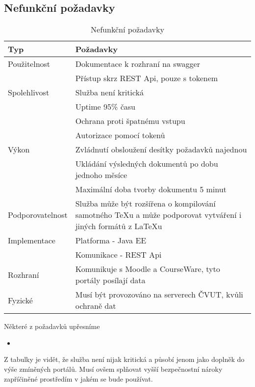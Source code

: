  \subsection{Nefunkční požadavky}
 
 \begin{table}[H]
 	\begin{center}
 		\begin{tabular}{ p{4cm} P{8,6cm} }
 			\textbf{Typ} & \textbf{Požadavky} \\
 			\midrule[0,15em]
 			Použitelnost & \tabitem Dokumentace k rozhraní na swagger\\
 						& \tabitem Přístup skrz REST Api, pouze s tokenem\\
 			\midrule		
 			Spolehlivost & \tabitem Služba není kritická\\
 						& \tabitem Uptime 95\% času\\
 						& \tabitem Ochrana proti špatnému vstupu\\
 						& \tabitem Autorizace pomocí tokenů\\
 			\midrule
 			Výkon & \tabitem Zvládnutí obsloužení desítky požadavků najednou\\
 						& \tabitem Ukládání výsledných dokumentů po dobu jednoho měsíce\\
 						& \tabitem Maximální doba tvorby dokumentu 5 minut\\	
			\midrule
			Podporovatelnost & \tabitem Služba může být rozšířena o kompilování samotného TeXu a může podporovat vytváření i jiných formátů z LaTeXu\\	
			\midrule
			Implementace & \tabitem Platforma - Java EE\\
						& \tabitem Komunikace - REST Api\\
			\midrule
 			Rozhraní & \tabitem Komunikuje s Moodle a CourseWare, tyto portály posílají data\\
 			\midrule
 			Fyzické & \tabitem Musí být provozováno na serverech ČVUT, kvůli ochraně dat\\
 	\end{tabular}
 	\end{center}
 	\caption{Nefunkční požadavky}
 	\label{tab:errors}
 \end{table}
 
 Některé z požadavků upřesníme
 \begin{itemize}
 	\item 
 \end{itemize}
 
 Z tabulky je vidět, že služba není nijak kritická a působí jenom jako doplněk do výše zmíněných portálů. Musí ovšem splňovat vyšší bezpečnostní nároky zapříčiněné prostředím v jakém se bude používat. 

